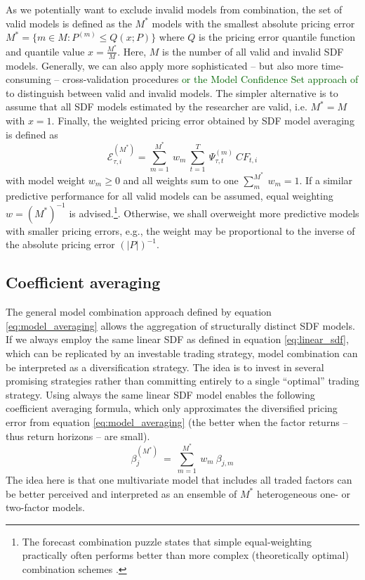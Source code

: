 \documentclass[12pt]{article}
\begin{document}
As we potentially want to exclude invalid models from combination, the set of valid models is defined as the $M^*$ models with the smallest absolute pricing error $M^*=\{m \in M: P^{(m)} \leq Q(x;P) \}$ where $Q$ is the pricing error quantile function and quantile value $x = \frac{M^*}{M}$.
Here, $M$ is the number of all valid and invalid SDF models.
Generally, we can also apply more sophisticated -- but also more time-consuming -- cross-validation procedures \citep{AC10} 
\textcolor{darkgreen}{or the Model Confidence Set approach of \cite{HLN11}} 
to distinguish between valid and invalid models.
The simpler alternative is to assume that all SDF models estimated by the researcher are valid, i.e. $M^*=M$ with $x=1$.
Finally, the weighted pricing error obtained by SDF model averaging is defined as
\begin{equation}
\label{eq:model_averaging}
\mathcal{E}_{\tau, i}^{(M^*)} = 
\sum_{m=1}^{M^*} \  
w_m \
\sum_{t=1}^{T} \
\Psi_{\tau,t}^{(m)}\ 
{CF}_{t, i}
\end{equation}
with model weight $w_m \geq 0$ and all weights sum to one $\sum_m^{M^*}\ w_m=1$. 
If a similar predictive performance for all valid models can be assumed, equal weighting $w=(M^*)^{-1}$ is advised.\footnote{The forecast combination puzzle states that simple equal-weighting practically often performs better than more complex (theoretically optimal) combination schemes \citep{SW09,CMVW16,QRCY19}.}.
Otherwise, we shall overweight more predictive models with smaller pricing errors, e.g., the weight may be proportional to the inverse of the absolute pricing error $\left(\left|P\right|\right)^{-1}$.

\subsection{Coefficient averaging}
\label{sec:coef_averaging}

The general model combination approach defined by equation \ref{eq:model_averaging} allows the aggregation of structurally distinct SDF models.
If we always employ the same linear SDF as defined in equation \ref{eq:linear_sdf}, which can be replicated by an investable trading strategy, model combination can be interpreted as a diversification strategy.
The idea is to invest in several promising strategies rather than committing entirely to a single ``optimal'' trading strategy.
Using always the same linear SDF model enables the following coefficient averaging formula, which only approximates the diversified pricing error from equation \ref{eq:model_averaging} (the better when the factor returns -- thus return horizons -- are small).
\begin{equation}
\label{eq:coef_averaging}
\beta_j^{(M^*)}\ =\ \sum_{m=1}^{M^*}\ w_m \ \beta_{j,m}
\end{equation}
The idea here is that one multivariate model that includes all traded factors can be better perceived and interpreted as an ensemble of $M^*$ heterogeneous one- or two-factor models.
\end{document}
